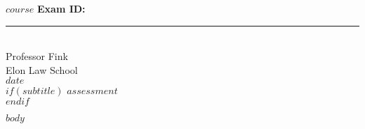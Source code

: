 \documentclass[letterpaper,11pt,twoside]{article}
\begin{document}
\thispagestyle{empty}

\begin{flushleft}
\titlefont\Large{$course$} \hfill\normalsize{\rmfamily\bfseries{Exam ID: }}\rule{2cm}{0.4pt}\\
\vspace{.2cm}
\rmfamily\normalsize{Professor Fink} \\
\rmfamily\normalsize{Elon Law School}\\
\rmfamily\normalsize{$date$}\\
$if(subtitle)$
\vspace{.6cm}
\titlefont\LARGE{$assessment$} \\
\vspace{-.6cm}
$endif$
\end{flushleft}

\RaggedRight

\singlespacing


$body$
\end{document}
